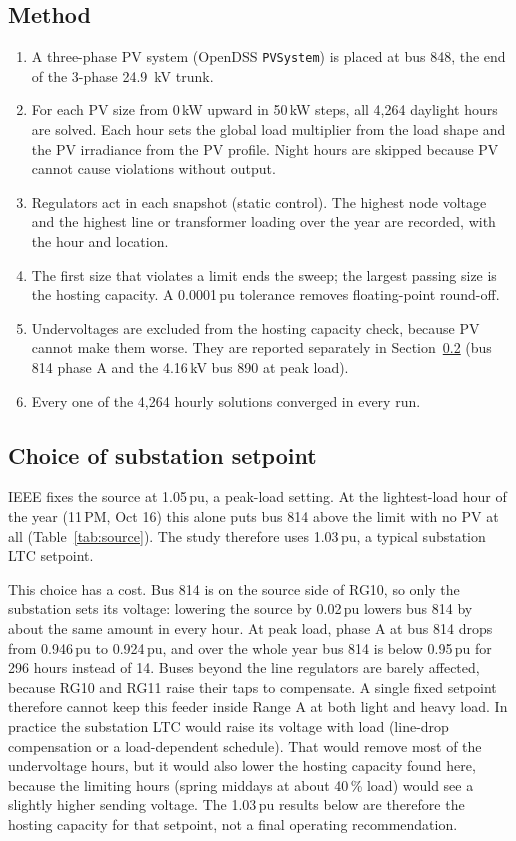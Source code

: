 \documentclass[11pt,letterpaper]{article}
\begin{document}
\subsection{Method}
\begin{enumerate}
  \item A three-phase PV system (OpenDSS \texttt{PVSystem}) is placed at bus 848, the end of the 3-phase
        \SI{24.9}{kV} trunk.
  \item For each PV size from 0\,kW upward in 50\,kW steps, all 4{,}264 daylight hours are solved. Each hour
        sets the global load multiplier from the load shape and the PV irradiance from the PV profile.
        Night hours are skipped because PV cannot cause violations without output.
  \item Regulators act in each snapshot (static control). The highest node voltage and the highest line
        or transformer loading over the year are recorded, with the hour and location.
  \item The first size that violates a limit ends the sweep; the largest passing size is the hosting
        capacity. A 0.0001\,pu tolerance removes floating-point round-off.
  \item Undervoltages are excluded from the hosting capacity check, because PV cannot make them worse.
        They are reported separately in Section~\ref{sec:setpoint} (bus 814 phase A and the 4.16\,kV bus 890
        at peak load).
  \item Every one of the 4{,}264 hourly solutions converged in every run.
\end{enumerate}

\subsection{Choice of substation setpoint}\label{sec:setpoint}
IEEE fixes the source at 1.05\,pu, a peak-load setting. At the lightest-load hour of the year (11\,PM, Oct 16)
this alone puts bus 814 above the limit with no PV at all (Table~\ref{tab:source}). The study therefore uses
1.03\,pu, a typical substation LTC setpoint.

This choice has a cost. Bus 814 is on the source side of RG10, so only the substation sets its voltage:
lowering the source by 0.02\,pu lowers bus 814 by about the same amount in every hour. At peak load, phase A
at bus 814 drops from 0.946\,pu to 0.924\,pu, and over the whole year bus 814 is below 0.95\,pu for 296 hours
instead of 14. Buses beyond the line regulators are barely affected, because RG10 and RG11 raise their taps
to compensate. A single fixed setpoint therefore cannot keep this feeder inside Range A at both light and
heavy load. In practice the substation LTC would raise its voltage with load (line-drop compensation or a
load-dependent schedule). That would remove most of the undervoltage hours, but it would also lower the
hosting capacity found here, because the limiting hours (spring middays at about 40\,\% load) would see a
slightly higher sending voltage. The 1.03\,pu results below are therefore the hosting capacity for that
setpoint, not a final operating recommendation.
\end{document}
